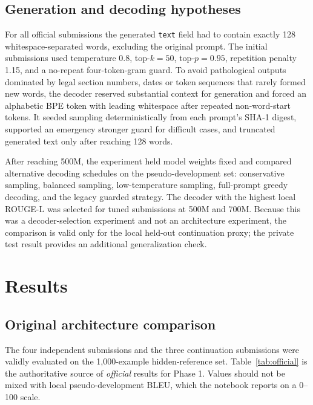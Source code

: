 \documentclass[11pt,a4paper]{article}
\newcommand{\method}[1]{\texttt{#1}}
\begin{document}
\subsection{Generation and decoding hypotheses}
For all official submissions the generated \method{text} field had to contain exactly 128 whitespace-separated words, excluding the original prompt. The initial submissions used temperature 0.8, top-\(k=50\), top-\(p=0.95\), repetition penalty 1.15, and a no-repeat four-token-gram guard. To avoid pathological outputs dominated by legal section numbers, dates or token sequences that rarely formed new words, the decoder reserved substantial context for generation and forced an alphabetic BPE token with leading whitespace after repeated non-word-start tokens. It seeded sampling deterministically from each prompt's SHA-1 digest, supported an emergency stronger guard for difficult cases, and truncated generated text only after reaching 128 words.

After reaching 500M, the experiment held model weights fixed and compared alternative decoding schedules on the pseudo-development set: conservative sampling, balanced sampling, low-temperature sampling, full-prompt greedy decoding, and the legacy guarded strategy. The decoder with the highest local ROUGE-L was selected for tuned submissions at 500M and 700M. Because this was a decoder-selection experiment and not an architecture experiment, the comparison is valid only for the local held-out continuation proxy; the private test result provides an additional generalization check.

\section{Results}
\subsection{Original architecture comparison}
The four independent submissions and the three continuation submissions were validly evaluated on the 1,000-example hidden-reference set. Table~\ref{tab:official} is the authoritative source of \emph{official} results for Phase 1. Values should not be mixed with local pseudo-development BLEU, which the notebook reports on a 0--100 scale.
\end{document}
